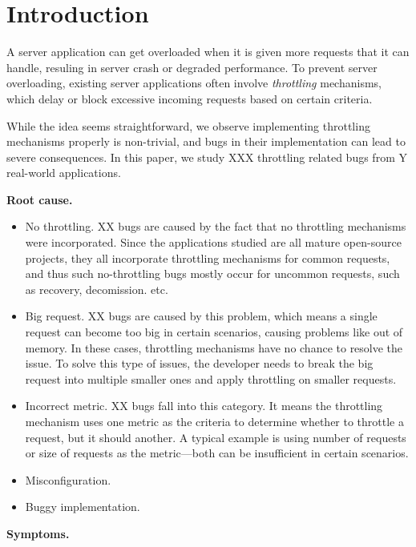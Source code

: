 \section{Introduction}

A server application can get overloaded when it is given more requests that it can handle,
resuling in server crash or degraded performance. To prevent server overloading, existing 
server applications often involve \emph{throttling} mechanisms, which delay or block
excessive incoming requests based on certain criteria.

While the idea seems straightforward, we observe implementing throttling mechanisms
properly is non-trivial, and bugs in their implementation can lead to severe consequences.
In this paper, we study XXX throttling related bugs from Y real-world applications.

\vspace{.05in}
\noindent
\textbf{Root cause.} 

\begin{itemize}

\item No throttling. XX bugs are caused by the fact that no throttling mechanisms
were incorporated. Since the applications studied are all mature open-source projects,
they all incorporate throttling mechanisms for common requests, and thus such no-throttling
bugs mostly occur for uncommon requests, such as recovery, decomission. etc.

\item Big request. XX bugs are caused by this problem, which means a single request can
become too big in certain scenarios, causing problems like out of memory. In these cases, throttling mechanisms
have no chance to resolve the issue. To solve this type of issues, the developer needs to
break the big request into multiple smaller ones and apply throttling on smaller requests.

\item Incorrect metric. XX bugs fall into this category. It means the throttling mechanism uses
one metric as the criteria to determine whether to throttle a request, but it should another. A
typical example is using number of requests or size of requests as the metric---both can be 
insufficient in certain scenarios.

\item Misconfiguration.

\item Buggy implementation.

\end{itemize}

\vspace{.05in}
\noindent
\textbf{Symptoms.}


